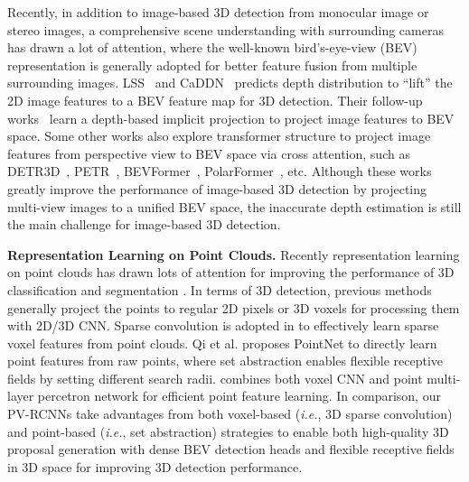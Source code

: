 \documentclass[natbib,twocolumn]{svjour3}          \smartqed  \usepackage{graphicx}
\begin{document}
Recently, in addition to image-based 3D detection from monocular image or stereo images, a comprehensive scene understanding with surrounding cameras has drawn a lot of attention, where the well-known bird's-eye-view (BEV) representation is generally adopted for better feature fusion from multiple surrounding images. 
LSS~\citep{philion2020lift} and CaDDN~\citep{reading2021categorical} predicts depth distribution to ``lift'' the 2D image features to a BEV feature map for 3D detection. Their follow-up works~\citep{huang2021bevdet,huang2022bevdet4d,li2022bevdepth,xie2022m} learn a depth-based implicit projection  to project image features to BEV space.
Some other works also explore transformer structure to project image features from perspective view to BEV space via cross attention, such as DETR3D~\citep{wang2022detr3d}, PETR~\citep{liu2022petr,liu2022petrv2}, BEVFormer~\citep{li2022bevformer}, PolarFormer~\citep{jiang2022polarformer}, etc. 
Although these works greatly improve the performance of image-based 3D detection by projecting multi-view images to a unified BEV space, the inaccurate depth estimation is still the main challenge for image-based 3D detection.


\noindent
\textbf{Representation Learning on Point Clouds.}
Recently representation learning on point clouds has drawn lots of attention for improving the performance of 3D classification and segmentation \citep{qi2017pointnet,qi2017pointnet++,wang2019dynamic,huang2018recurrent,zhao2019pointweb,li2018pointcnn,su2018splatnet,wu2019pointconv,jaritz2019multi,jiang2019hierarchical,thomas2019kpconv,choy20194d,liu2020closer}. 
In terms of 3D detection, previous methods generally project the points to regular 2D pixels \citep{Chen2017CVPR,yang2018pixor} or 3D voxels \citep{zhou2018voxelnet,chen2019fast} for processing them with 2D/3D CNN. Sparse convolution \citep{3DSemanticSegmentationWithSubmanifoldSparseConvNet} is adopted in \citep{yan2018second,shi2020part} to effectively learn sparse voxel features from point clouds. Qi et al. \citep{qi2017pointnet,qi2017pointnet++} proposes PointNet to directly learn point features from raw points, where set abstraction enables flexible receptive fields by setting different search radii. \citep{liu2019point} combines both voxel CNN and point multi-layer percetron network for efficient point feature learning. 
In comparison, our PV-RCNNs take advantages from both voxel-based (\emph{i.e.}, 3D sparse convolution) and point-based (\emph{i.e.}, set abstraction) strategies to enable both high-quality 3D proposal generation with dense BEV detection heads and flexible receptive fields in 3D space for improving 3D detection performance. 
\end{document}
